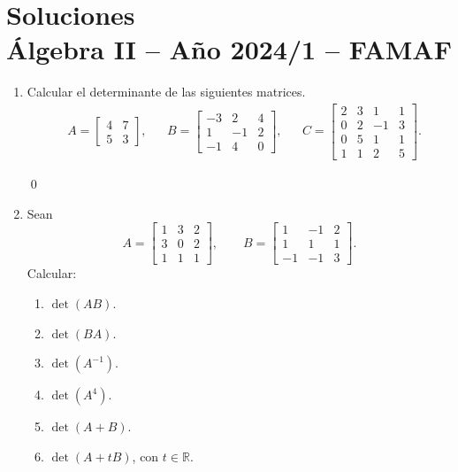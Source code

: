 
\chapter{Soluciones\\Álgebra  II -- Año 2024/1 -- FAMAF}\label{practico-4}

\begin{enumerate}[topsep=6pt,itemsep=.4cm]
    \item Calcular el determinante de las siguientes matrices.
        \begin{align*}
        &A=\begin{bmatrix} 4&7\\ 5&3\end{bmatrix},
        &&B=\begin{bmatrix} -3&2&4\\ 1&-1&2\\ -1&4&0\end{bmatrix},
        &&
        C=\begin{bmatrix} 2&3&1&1\\ 0&2&-1&3 \\ 0&5&1&1 \\1&1&2&5\end{bmatrix}.
        \end{align*}
        \rta

        \qed
    
    \item Sean
            $$A=
        \begin{bmatrix}
            1&3&2 \\
            3&0&2 \\
            1&1&1
        \end{bmatrix}, \qquad
        B =
        \begin{bmatrix}
            1&-1&2\\
            1&1&1 \\
            -1&-1&3
        \end{bmatrix}.
        $$
        Calcular:
        \begin{multicols}{3}
        \begin{enumerate}
            \item $\det(AB)$.
            \item $\det(BA)$.
            \item $\det(A^{-1})$.
            \item $\det(A^{4})$.
            \item $\det(A+B)$.
            \item $\det(A+tB)$, con $t \in \mathbb{R}$.
        \end{enumerate}
    \end{multicols}
    \rta


\end{enumerate}
